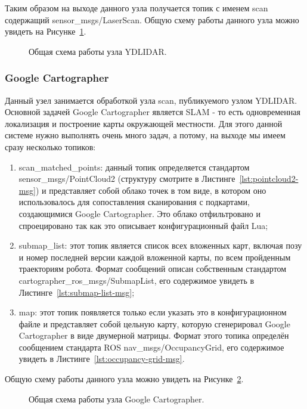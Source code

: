 Таким образом на выходе данного узла получается топик с именем scan содержащий sensor\_msgs/LaserScan. Общую схему работы данного узла можно увидеть на Рисунке~\ref{fig:node-ydlidar}.

\begin{figure}[ht]
  \caption{Общая схема работы узла YDLIDAR.}\label{fig:node-ydlidar}
\end{figure}

\subsubsection{Google Cartographer}
Данный узел занимается обработкой узла scan, публикуемого узлом YDLIDAR. Основной задачей Google Cartographer является SLAM - то есть одновременная локализация и построение карты окружающей местности. Для этого данной системе нужно выполнять очень много задач, а потому, на выходе мы имеем сразу несколько топиков\cite{cartographer}:
\begin{enumerate}
\item scan\_matched\_points: данный топик определяется стандартом sensor\_msgs/PointCloud2 (структуру смотрите в Листинге~\ref{lst:pointcloud2-msg}) и представляет собой облако точек в том виде, в котором оно использовалось для сопоставления сканирования с подкартами, создающимися Google Cartographer. Это облако отфильтровано и спроецировано так как это описывает конфигурационный файл Lua;
\item submap\_list: этот топик является список всех вложенных карт, включая позу и номер последней версии каждой вложенной карты, по всем пройденным траекториям робота. Формат сообщений описан собственным стандартом cartographer\_ros\_msgs/SubmapList, его содержимое увидеть в Листинге~\ref{lst:submap-list-msg};
\item map: этот топик появляется только если указать это в конфигурационном файле и представляет собой цельную карту, которую сгенерировал Google Cartographer в виде двумерной матрицы. Формат этого топика определён сообщением стандарта ROS nav\_msgs/OccupancyGrid, его содержимое увидеть в Листинге~\ref{lst:occupancy-grid-msg}.
\end{enumerate}

Общую схему работы данного узла можно увидеть на Рисунке~\ref{fig:node-cartographer}.

\begin{figure}[ht]
  \caption{Общая схема работы узла Google Cartographer.}\label{fig:node-cartographer}
\end{figure}

